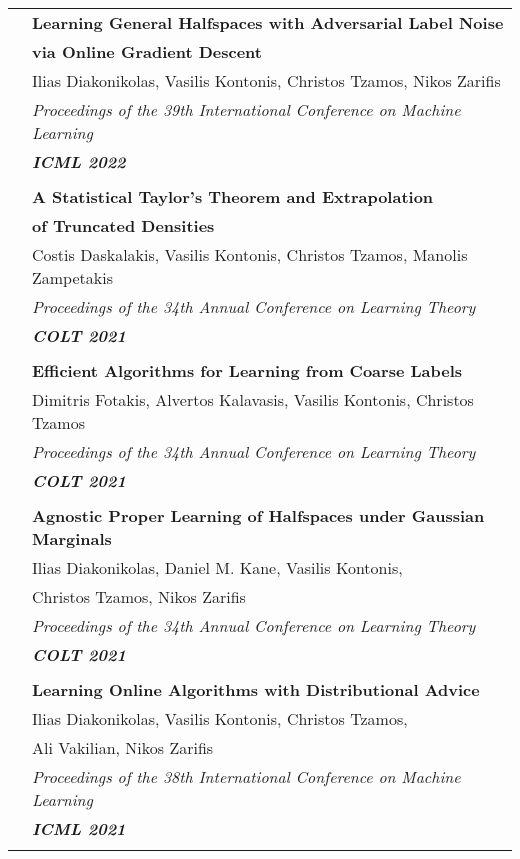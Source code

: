 \documentclass[letterpaper,11pt,oneside]{article}
\begin{document}
\begin{longtable}{@{} l l}
 &\textbf{Learning General Halfspaces with Adversarial Label Noise}\\
 & \textbf{via Online Gradient Descent}\\
 & Ilias Diakonikolas, Vasilis Kontonis, Christos Tzamos, Nikos Zarifis \\
 & \emph{Proceedings of the 39th International Conference on Machine Learning} \\
 & \emph{\textbf{ICML 2022}} \\
 & \\


 &\textbf{A Statistical Taylor's Theorem and Extrapolation}\\
 & \textbf{of Truncated Densities}\\
 & Costis Daskalakis, Vasilis Kontonis, Christos Tzamos, Manolis Zampetakis \\
 & \emph{Proceedings of the 34th Annual Conference on Learning Theory} \\
 & \emph{\textbf{COLT 2021}} \\
 & \\

 &\textbf{Efficient Algorithms for Learning from Coarse Labels}\\
 &  Dimitris Fotakis, Alvertos Kalavasis, Vasilis Kontonis, Christos Tzamos \\
 & \emph{Proceedings of the 34th Annual Conference on Learning Theory} \\
 & \emph{\textbf{COLT 2021}} \\
 & \\

&\textbf{Agnostic Proper Learning of Halfspaces under Gaussian Marginals}\\
& Ilias Diakonikolas, Daniel M. Kane, Vasilis Kontonis,\\
& Christos Tzamos, Nikos Zarifis \\
& \emph{Proceedings of the 34th Annual Conference on Learning Theory} \\
& \emph{\textbf{COLT 2021}} \\
& \\

     &\textbf{Learning Online Algorithms with Distributional Advice}\\
     & Ilias Diakonikolas, Vasilis Kontonis, Christos Tzamos,\\
     & Ali Vakilian, Nikos Zarifis \\
     & \emph{Proceedings of the 38th International Conference on Machine Learning} \\
     & \emph{\textbf{ICML 2021}} \\
     & \\


\end{longtable}
\end{document}
